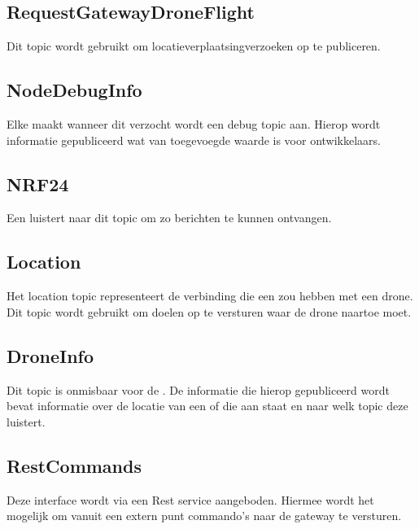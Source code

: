 \documentclass[a4paper, 11pt, oneside]{report}
\begin{document}
\subsection{RequestGatewayDroneFlight}
\label{architectural:ros:topic:RequestGatewayDroneFlight}
Dit topic wordt gebruikt om locatieverplaatsingverzoeken op te publiceren. 

\subsection{NodeDebugInfo}
\label{architectural:ros:topic:NodeDebugInfo}
Elke  maakt wanneer dit verzocht wordt een debug topic aan. Hierop wordt informatie gepubliceerd wat van toegevoegde waarde is voor ontwikkelaars.

\subsection{NRF24}
\label{architectural:ros:topic:NRF24}
Een  luistert naar dit topic om zo berichten te kunnen ontvangen.

\subsection{Location}
\label{architectural:ros:topic:Location}
Het location topic representeert de verbinding die een  zou hebben met een drone. Dit topic wordt gebruikt om doelen op te versturen waar de drone naartoe moet. 

\subsection{DroneInfo}
\label{architectural:ros:topic:DroneInfo}
Dit topic is onmisbaar voor de . De informatie die hierop gepubliceerd wordt bevat informatie over de locatie van een  of die aan staat en naar welk  topic deze luistert.

\subsection{RestCommands}
\label{architectural:rest:RestCommands}
Deze interface wordt via een Rest service aangeboden. 
Hiermee wordt het mogelijk om vanuit een extern punt commando's naar de gateway te versturen.
\end{document}

